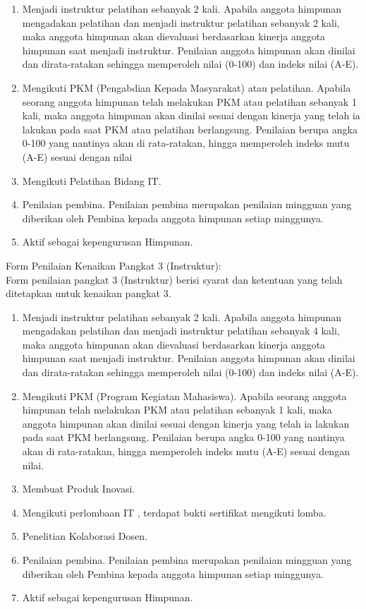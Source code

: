 \begin{enumerate}
 \item Menjadi instruktur pelatihan sebanyak 2 kali. Apabila anggota himpunan mengadakan pelatihan dan menjadi instruktur pelatihan sebanyak 2 kali, maka anggota himpunan akan dievaluasi berdasarkan kinerja anggota himpunan saat menjadi instruktur. Penilaian anggota himpunan akan dinilai dan dirata-ratakan sehingga memperoleh nilai (0-100) dan indeks nilai (A-E).
 \item Mengikuti PKM (Pengabdian Kepada Masyarakat) atau pelatihan. Apabila seorang anggota himpunan telah melakukan PKM atau pelatihan sebanyak 1 kali, maka anggota himpunan akan dinilai sesuai dengan kinerja yang telah ia lakukan pada saat PKM atau pelatihan berlangsung. Penilaian berupa angka 0-100 yang nantinya akan di rata-ratakan, hingga memperoleh indeks mutu (A-E) sesuai dengan nilai
 \item Mengikuti Pelatihan Bidang IT.
 \item Penilaian pembina. Penilaian pembina merupakan penilaian mingguan yang diberikan oleh Pembina kepada anggota himpunan setiap minggunya.
 \item Aktif sebagai kepengurusan Himpunan.
 
\end{enumerate}
Form Penilaian Kenaikan Pangkat 3 (Instruktur):\\
Form penilaian pangkat 3 (Instruktur) berisi syarat dan ketentuan yang telah ditetapkan untuk kenaikan pangkat 3.\\
\begin{enumerate}
 \item Menjadi instruktur pelatihan sebanyak 2 kali. Apabila anggota himpunan mengadakan pelatihan dan menjadi instruktur pelatihan sebanyak 4 kali, maka anggota himpunan akan dievaluasi berdasarkan kinerja anggota himpunan saat menjadi instruktur. Penilaian anggota himpunan akan dinilai dan dirata-ratakan sehingga memperoleh nilai (0-100) dan indeks nilai (A-E).
 \item Mengikuti PKM (Program Kegiatan Mahasiswa). Apabila seorang anggota himpunan telah melakukan PKM atau pelatihan sebanyak 1 kali, maka anggota himpunan akan dinilai sesuai dengan kinerja yang telah ia lakukan pada saat PKM berlangsung. Penilaian berupa angka 0-100 yang nantinya akan di rata-ratakan, hingga memperoleh indeks mutu (A-E) sesuai dengan nilai.
 \item Membuat Produk Inovasi.
 \item Mengikuti perlombaan IT , terdapat bukti sertifikat mengikuti lomba.
 \item Penelitian Kolaborasi Dosen.
 \item Penilaian pembina. Penilaian pembina merupakan penilaian mingguan yang diberikan oleh Pembina kepada anggota himpunan setiap minggunya.
 \item Aktif sebagai kepengurusan Himpunan.
 
 
\end{enumerate}



